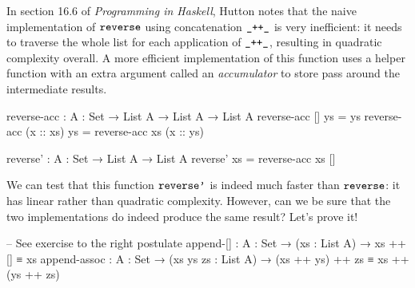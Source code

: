 \documentclass[a4paper,UKenglish]{tufte-handout}
\theoremstyle{definition}
\newcommand\fun[1]{{\AgdaFunction{#1}}}
\begin{document}
In section 16.6 of \emph{Programming in Haskell}, Hutton notes that
the naive implementation of $\fun{reverse}$ using concatenation
$\fun{\_++\_}$ is very inefficient: it needs to traverse the whole
list for each application of $\fun{\_++\_}$, resulting in quadratic
complexity overall. A more efficient implementation of this function
uses a helper function with an extra argument called an
\emph{accumulator} to store pass around the intermediate results.
\begin{AgdaAlign}
\begin{AgdaSuppressSpace}
\begin{code}[number]
reverse-acc : {A : Set} → List A → List A → List A
reverse-acc []        ys = ys
reverse-acc (x :: xs) ys = reverse-acc xs (x :: ys)

\end{code}
\begin{code}[number]
reverse' : {A : Set} → List A → List A
reverse' xs = reverse-acc xs []
\end{code}
\end{AgdaSuppressSpace}
\end{AgdaAlign}
We can test that this function $\fun{reverse'}$ is indeed much faster
than $\fun{reverse}$: it has linear rather than quadratic complexity.
However, can we be sure that the two implementations do indeed produce
the same result? Let's prove it!
\begin{code}[hide]
-- See exercise to the right
postulate
  append-[] : {A : Set} → (xs : List A) → xs ++ [] ≡ xs
  append-assoc : {A : Set} → (xs ys zs : List A)
               → (xs ++ ys) ++ zs ≡ xs ++ (ys ++ zs)
\end{code}
\end{document}
